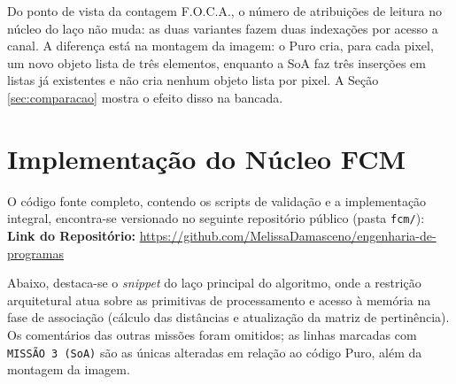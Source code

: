 \documentclass[11pt,a4paper]{article}
\begin{document}
Do ponto de vista da contagem F.O.C.A., o número de atribuições de leitura no núcleo do laço não muda: as duas variantes fazem duas indexações por acesso a canal. A diferença está na montagem da imagem: o Puro cria, para cada pixel, um novo objeto lista de três elementos, enquanto a SoA faz três inserções em listas já existentes e não cria nenhum objeto lista por pixel. A Seção \ref{sec:comparacao} mostra o efeito disso na bancada.

\section{Implementação do Núcleo FCM}
O código fonte completo, contendo os scripts de validação e a implementação integral, encontra-se versionado no seguinte repositório público (pasta \texttt{fcm/}): \\
\textbf{Link do Repositório:} \url{https://github.com/MelissaDamasceno/engenharia-de-programas}

Abaixo, destaca-se o \textit{snippet} do laço principal do algoritmo, onde a restrição arquitetural atua sobre as primitivas de processamento e acesso à memória na fase de associação (cálculo das distâncias e atualização da matriz de pertinência). Os comentários das outras missões foram omitidos; as linhas marcadas com \texttt{MISSÃO 3 (SoA)} são as únicas alteradas em relação ao código Puro, além da montagem da imagem.
\end{document}
